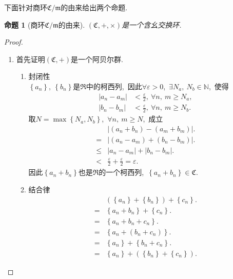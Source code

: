 \documentclass[UTF8, twoside]{ctexart}
\theoremstyle{nonumberplain}
\newtheorem{proof}{\heiti 证明}  %
\theoremstyle{nonumberplain}
\theoremstyle{plain}
\newtheorem{mingti}[dingyi]{命题}
\begin{document}
	下面针对商环$\mathfrak{C}/\mathfrak{m}$的由来给出两个命题.\ 
	\begin{mingti}[商环$\mathfrak{C}/\mathfrak{m}$的由来]
		\label{202101310732-1}
		$\left( \mathfrak{C},+,\times  \right)$是一个含幺交换环.\ 
	\end{mingti}
	\begin{proof}
		\ 
		\begin{enumerate}
			\item 首先证明$\left( \mathfrak{C},+ \right)$是一个阿贝尔群.\ 
			\vskip 0.3cm
			\begin{enumerate}
				\item 封闭性 \\
				$\left\{ {{a}_{n}} \right\},\ \left\{ {{b}_{n}} \right\}$是$\Re $中的柯西列,\ 因此$\forall \varepsilon >0$,\ $\exists {{N}_{a}},\ {{N}_{b}}\in \mathbb{N}$,\ 使得
				\begin{subequations}
					\begin{align}
					\left| {{a}_{n}}-{{a}_{m}} \right|&<\frac{\varepsilon }{2},\ \forall n,\ m\ge {{N}_{a}}, 
					\label{A.3.1a}
					\\ 
					\left| {{b}_{n}}-{{b}_{m}} \right|&<\frac{\varepsilon }{2},\ \forall n,\ m\ge {{N}_{b}}. 
					\label{A.3.1b}
					\end{align} 
				\end{subequations}
				取$N=\max \left\{ {{N}_{a}},{{N}_{b}} \right\}$,\ $\forall n,\ m\ge N$,\ 成立
				\begin{align*}
					&\left| \left( {{a}_{n}}+{{b}_{n}} \right)-\left( {{a}_{m}}+{{b}_{m}} \right) \right|. \\ 
					=&\left| \left( {{a}_{n}}-{{a}_{m}} \right)+\left( {{b}_{n}}-{{b}_{m}} \right) \right|. \\ 
					\le& \left| {{a}_{n}}-{{a}_{m}} \right|+\left| {{b}_{n}}-{{b}_{m}} \right|. \\ 
					<&\frac{\varepsilon }{2}+\frac{\varepsilon }{2}=\varepsilon . 
				\end{align*}
				因此$\left\{ {{a}_{n}}+{{b}_{n}} \right\}$也是$\Re $的一个柯西列,\ $\left\{ {{a}_{n}}+{{b}_{n}} \right\}\in  \mathfrak{C}$.\ 
				\vskip 0.3cm
				
				\item 结合律 
				\begin{align*}
					& \left( \left\{ {{a}_{n}} \right\}+\left\{ {{b}_{n}} \right\} \right)+\left\{ {{c}_{n}} \right\}. \\ 
					=&\left\{ {{a}_{n}}+{{b}_{n}} \right\}+\left\{ {{c}_{n}} \right\}. \\ 
					=&\left\{ {{a}_{n}}+{{b}_{n}}+{{c}_{n}} \right\}. \\ 
					=&\left\{ {{a}_{n}}+\left( {{b}_{n}}+{{c}_{n}} \right) \right\}. \\ 
					=&\left\{ {{a}_{n}} \right\}+\left\{ {{b}_{n}}+{{c}_{n}} \right\} .\\ 
					=&\left\{ {{a}_{n}} \right\}+\left( \left\{ {{b}_{n}} \right\}+\left\{ {{c}_{n}} \right\} \right). 
				\end{align*}
				\vskip 0.3cm
				

\end{enumerate}
\end{enumerate}
\end{proof}
\end{document}
